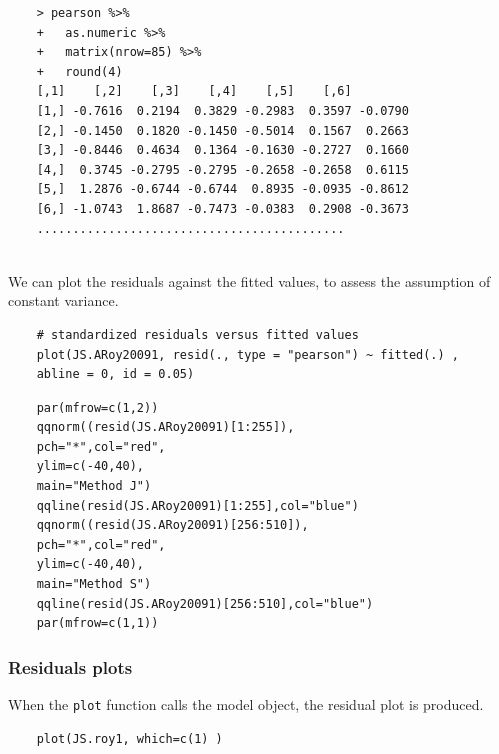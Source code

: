 \documentclass[a4paper,12pt]{article}
\begin{document}
\begin{framed}
	\begin{verbatim}
	> pearson %>%
	+   as.numeric %>% 
	+   matrix(nrow=85) %>%
	+   round(4) 
	[,1]    [,2]    [,3]    [,4]    [,5]    [,6]
	[1,] -0.7616  0.2194  0.3829 -0.2983  0.3597 -0.0790
	[2,] -0.1450  0.1820 -0.1450 -0.5014  0.1567  0.2663
	[3,] -0.8446  0.4634  0.1364 -0.1630 -0.2727  0.1660
	[4,]  0.3745 -0.2795 -0.2795 -0.2658 -0.2658  0.6115
	[5,]  1.2876 -0.6744 -0.6744  0.8935 -0.0935 -0.8612
	[6,] -1.0743  1.8687 -0.7473 -0.0383  0.2908 -0.3673
	...........................................
	
	\end{verbatim}
\end{framed}

We can plot the residuals against the fitted values, to assess the assumption of constant variance. 
\begin{framed}
	\begin{verbatim}
	# standardized residuals versus fitted values 
	plot(JS.ARoy20091, resid(., type = "pearson") ~ fitted(.) , 
	abline = 0, id = 0.05)
	\end{verbatim}
\end{framed}


\begin{framed}
	\begin{verbatim}
	par(mfrow=c(1,2))
	qqnorm((resid(JS.ARoy20091)[1:255]),
	pch="*",col="red",
	ylim=c(-40,40),
	main="Method J")
	qqline(resid(JS.ARoy20091)[1:255],col="blue")
	qqnorm((resid(JS.ARoy20091)[256:510]),
	pch="*",col="red",
	ylim=c(-40,40),
	main="Method S")
	qqline(resid(JS.ARoy20091)[256:510],col="blue")
	par(mfrow=c(1,1))
	\end{verbatim}	
\end{framed}

\subsubsection{Residuals plots}



When the \texttt{plot} function calls the model object, the residual plot is produced.




\begin{framed}
	\begin{verbatim}
	plot(JS.roy1, which=c(1) )
	\end{verbatim}
\end{framed}
\end{document}

